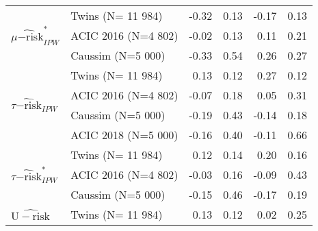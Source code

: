 \begin{tabular}{llrrrr}
    \cline{1-6} \cline{2-6}
    \multirow[c]{3}{*}{$\widehat{\mu\mathrm{-risk}}^{*}_{IPW}$}  & Twins
    (N= 11 984)                                                  & -0.32     & 0.13   & -0.17 & 0.13         \\
    \cline{2-6}
                                                                 & ACIC 2016
    (N=4 802)                                                    & -0.02     & 0.13   & 0.11  & 0.21         \\
    \cline{2-6}
                                                                 & Caussim
    (N=5 000)                                                    & -0.33     & 0.54   & 0.26  & 0.27         \\
    \cline{1-6} \cline{2-6}
    \multirow[c]{4}{*}{$\widehat{\tau\mathrm{-risk}}_{IPW}$}     & Twins
    (N= 11 984)                                                  & 0.13      & 0.12   & 0.27  & 0.12         \\
    \cline{2-6}
                                                                 & ACIC 2016
    (N=4 802)                                                    & -0.07     & 0.18   & 0.05  & 0.31         \\
    \cline{2-6}
                                                                 & Caussim
    (N=5 000)                                                    & -0.19     & 0.43   & -0.14 & 0.18         \\
    \cline{2-6}
                                                                 & ACIC 2018
    (N=5 000)                                                    & -0.16     & 0.40   & -0.11 & 0.66         \\
    \cline{1-6} \cline{2-6}
    \multirow[c]{3}{*}{$\widehat{\tau\mathrm{-risk}}_{IPW}^{*}$} & Twins
    (N= 11 984)                                                  & 0.12      & 0.14   & 0.20  & 0.16         \\
    \cline{2-6}
                                                                 & ACIC 2016
    (N=4 802)                                                    & -0.03     & 0.16   & -0.09 & 0.43         \\
    \cline{2-6}
                                                                 & Caussim
    (N=5 000)                                                    & -0.15     & 0.46   & -0.17 & 0.19         \\
    \cline{1-6} \cline{2-6}
    \multirow[c]{4}{*}{$\widehat{\mathrm{U-risk}}$}              & Twins
    (N= 11 984)                                                  & 0.13      & 0.12   & 0.02  & 0.25         \\

\end{tabular}
